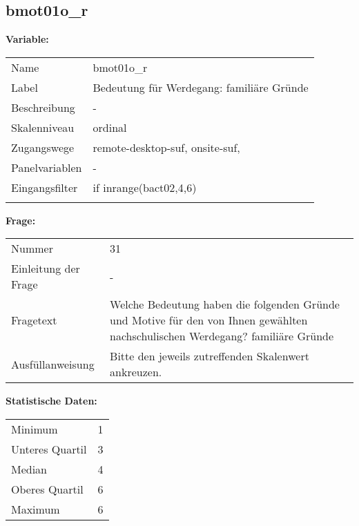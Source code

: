 	
	
	\subsection{bmot01o\_r}
	\label{subSection:bmot01o_r}

	\noindent\textbf{Variable:}\\
		\begin{tabular}{lL{11.3cm}}
			\label{tableVariable:bmot01o_r}
			Name & bmot01o\_r \\
			Label & Bedeutung für Werdegang: familiäre Gründe \\
			Beschreibung & - \\
			Skalenniveau & ordinal \\
			Zugangswege &
				remote-desktop-suf,
				onsite-suf,
 \\
			Panelvariablen & -
			 \\
			Eingangsfilter & if inrange(bact02,4,6)  \\
 \\
		\end{tabular}

		\vspace*{1 cm}
		\noindent\textbf{Frage:}\\
		\begin{tabular}{lL{11.3cm}}
			\label{tableQuestion:bmot01o_r}
			Nummer & 31 \\
			Einleitung der Frage & - \\
			Fragetext & Welche Bedeutung haben die folgenden Gründe und Motive für den von Ihnen gewählten nachschulischen Werdegang?
familiäre Gründe \\
			Ausfüllanweisung & Bitte den jeweils zutreffenden Skalenwert ankreuzen. \\
		\end{tabular}


		\vspace*{1 cm}
		\noindent\textbf{Statistische Daten:}\\
			\begin{tabular}{ll}
				\label{tableStatistics:bmot01o_r}
					Minimum & 1 \\
					Unteres Quartil & 3 \\
					Median & 4 \\
					Oberes Quartil & 6 \\
					Maximum & 6 \\
			\end{tabular}



